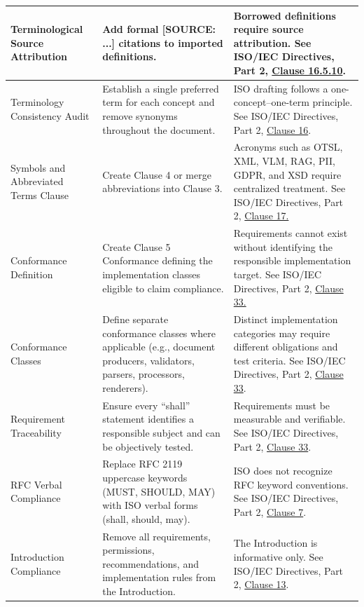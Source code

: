 \documentclass[11pt,a4paper]{article}
\begin{document}
\begin{table}[h]
\begin{tabular}{|l|l|l|}
Terminological Source Attribution & Add formal [SOURCE: ...] citations to imported definitions. & Borrowed definitions require source attribution. See ISO/IEC Directives, Part 2, \href{https://www.iso.org/sites/directives/current/part2/index.xhtml\#\_idTextAnchor005}{Clause 16.5.10}. \\ \hline
Terminology Consistency Audit & Establish a single preferred term for each concept and remove synonyms throughout the document. & ISO drafting follows a one-concept–one-term principle. See ISO/IEC Directives, Part 2, \href{https://www.iso.org/sites/directives/current/part2/index.xhtml\#\_idTextAnchor005}{Clause 16}. \\ \hline
Symbols and Abbreviated Terms Clause & Create Clause 4 or merge abbreviations into Clause 3. & Acronyms such as OTSL, XML, VLM, RAG, PII, GDPR, and XSD require centralized treatment. See ISO/IEC Directives, Part 2, \href{https://www.iso.org/sites/directives/current/part2/index.xhtml\#\_idTextAnchor005}{Clause 17.} \\ \hline
Conformance Definition & Create Clause 5 Conformance defining the implementation classes eligible to claim compliance. & Requirements cannot exist without identifying the responsible implementation target. See ISO/IEC Directives, Part 2, \href{https://www.iso.org/sites/directives/current/part2/index.xhtml\#\_idTextAnchor005}{Clause 33.} \\ \hline
Conformance Classes & Define separate conformance classes where applicable (e.g., document producers, validators, parsers, processors, renderers). & Distinct implementation categories may require different obligations and test criteria. See ISO/IEC Directives, Part 2, \href{https://www.iso.org/sites/directives/current/part2/index.xhtml\#\_idTextAnchor005}{Clause 33}. \\ \hline
Requirement Traceability & Ensure every “shall” statement identifies a responsible subject and can be objectively tested. & Requirements must be measurable and verifiable. See ISO/IEC Directives, Part 2, \href{https://www.iso.org/sites/directives/current/part2/index.xhtml\#\_idTextAnchor005}{Clause 33}. \\ \hline
RFC Verbal Compliance & Replace RFC 2119 uppercase keywords (MUST, SHOULD, MAY) with ISO verbal forms (shall, should, may). & ISO does not recognize RFC keyword conventions. See ISO/IEC Directives, Part 2, \href{https://www.iso.org/sites/directives/current/part2/index.xhtml\#\_idTextAnchor005}{Clause 7}. \\ \hline
Introduction Compliance & Remove all requirements, permissions, recommendations, and implementation rules from the Introduction. & The Introduction is informative only. See ISO/IEC Directives, Part 2, \href{https://www.iso.org/sites/directives/current/part2/index.xhtml\#\_idTextAnchor005}{Clause 13}. \\ \hline

\end{tabular}
\end{table}
\end{document}
